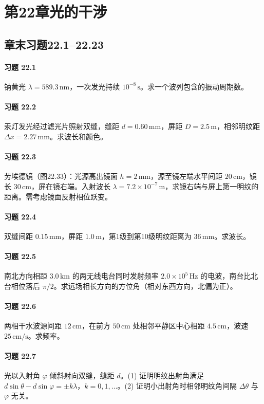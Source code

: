 \section*{第22章\quad 光的干涉}
\subsection*{章末习题22.1--22.23}
\paragraph{习题 22.1}
钠黄光 \(\lambda=589.3\,\mathrm{nm}\)，一次发光持续 \(10^{-8}\,\mathrm s\)。求一个波列包含的振动周期数。
\paragraph{习题 22.2}
汞灯发光经过滤光片照射双缝，缝距 \(d=0.60\,\mathrm{mm}\)，屏距 \(D=2.5\,\mathrm m\)，相邻明纹距 \(\Delta x=2.27\,\mathrm{mm}\)。求波长和颜色。
\paragraph{习题 22.3}
劳埃德镜（图22.33）：光源高出镜面 \(h=2\,\mathrm{mm}\)，源至镜左端水平间距 \(20\,\mathrm{cm}\)，镜长 \(30\,\mathrm{cm}\)，屏在镜右端。入射波长 \(\lambda=7.2\times10^{-7}\,\mathrm m\)，求镜右端与屏上第一明纹的距离。需考虑镜面反射相位跃变。
\paragraph{习题 22.4}
双缝间距 \(0.15\,\mathrm{mm}\)，屏距 \(1.0\,\mathrm m\)，第1级到第10级明纹距离为 \(36\,\mathrm{mm}\)。求波长。
\paragraph{习题 22.5}
南北方向相距 \(3.0\,\mathrm{km}\) 的两无线电台同时发射频率 \(2.0\times10^5\,\mathrm{Hz}\) 的电波，南台比北台相位落后 \(\pi/2\)。求远场相长方向的方位角（相对东西方向，北偏为正）。
\paragraph{习题 22.6}
两相干水波源间距 \(12\,\mathrm{cm}\)，在前方 \(50\,\mathrm{cm}\) 处相邻平静区中心相距 \(4.5\,\mathrm{cm}\)，波速 \(25\,\mathrm{cm/s}\)。求频率。
\paragraph{习题 22.7}
光以入射角 \(\varphi\) 倾斜射向双缝，缝距 \(d\)。(1) 证明明纹出射角满足 \(d\sin\theta-d\sin\varphi=\pm k\lambda\)，\(k=0,1,\ldots\)。(2) 证明小出射角时相邻明纹角间隔 \(\Delta\theta\) 与 \(\varphi\) 无关。
